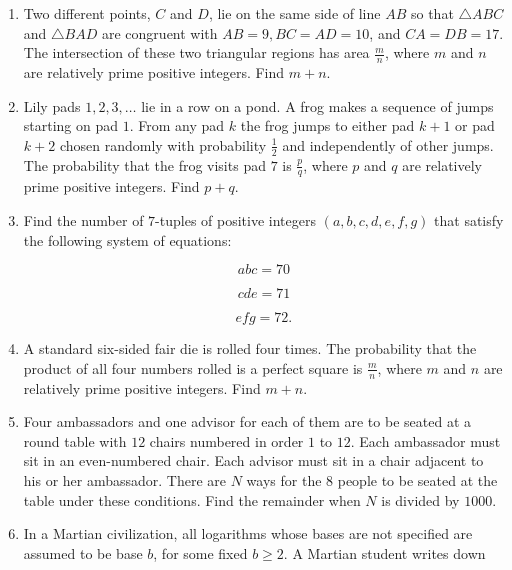 \documentclass{article}
\begin{document}
\begin{enumerate}[label=\arabic*., itemsep=0.5em]
\item Two different points, \(C\) and \(D\), lie on the same side of line \(AB\) so that \(\triangle ABC\) and \(\triangle BAD\) are congruent with \(AB=9,BC=AD=10\), and \(CA=DB=17\). The intersection of these two triangular regions has area \(\tfrac{m}{n}\), where \(m\) and \(n\) are relatively prime positive integers. Find \(m+n\).\par \vspace{0.5em}\item Lily pads \(1,2,3,\ldots\) lie in a row on a pond. A frog makes a sequence of jumps starting on pad \(1\). From any pad \(k\) the frog jumps to either pad \(k+1\) or pad \(k+2\) chosen randomly with probability \(\tfrac{1}{2}\) and independently of other jumps. The probability that the frog visits pad \(7\) is \(\tfrac{p}{q}\), where \(p\) and \(q\) are relatively prime positive integers. Find \(p+q\).\par \vspace{0.5em}\item Find the number of \(7\)-tuples of positive integers \((a,b,c,d,e,f,g)\) that satisfy the following system of equations: 

\begin{equation*}
abc=70
\end{equation*}


\begin{equation*}
cde=71
\end{equation*}


\begin{equation*}
efg=72.
\end{equation*}
\par \vspace{0.5em}\item A standard six-sided fair die is rolled four times. The probability that the product of all four numbers rolled is a perfect square is \(\tfrac{m}{n}\), where \(m\) and \(n\) are relatively prime positive integers. Find \(m+n\).\par \vspace{0.5em}\item Four ambassadors and one advisor for each of them are to be seated at a round table with \(12\) chairs numbered in order \(1\) to \(12\). Each ambassador must sit in an even-numbered chair. Each advisor must sit in a chair adjacent to his or her ambassador. There are \(N\) ways for the \(8\) people to be seated at the table under these conditions. Find the remainder when \(N\) is divided by \(1000\).\par \vspace{0.5em}\item In a Martian civilization, all logarithms whose bases are not specified are assumed to be base \(b\), for some fixed \(b\ge2\). A Martian student writes down


\end{enumerate}
\end{document}
